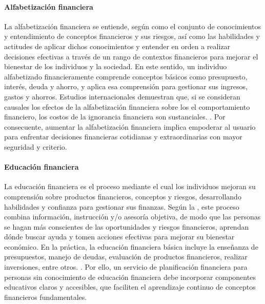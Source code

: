 \paragraph*{Alfabetización financiera}
La alfabetización financiera se entiende, según \textcite{OECD01} como el conjunto de conocimientos y entendimiento de conceptos financieros y sus riesgos, así como las habilidades y actitudes de aplicar dichos conocimientos y entender en orden a realizar decisiones efectivas a través de un rango de contextos financieros para mejorar el bienestar de los individuos y la sociedad. En este sentido, un individuo alfabetizado financieramente comprende conceptos básicos como presupuesto, interés, deuda y ahorro, y aplica esa comprensión para gestionar sus ingresos, gastos y ahorros. Estudios internacionales demuestran que, si se consideran causales los efectos de la alfabetización financiera sobre los el comportamiento financiero, los costos de la ignorancia financiera son sustanciales. \parencite[p.~17]{PMC01}. Por consecuente, aumentar la alfabetización financiera implica empoderar al usuario para enfrentar decisiones financieras cotidianas y extraordinarias con mayor seguridad y criterio.

\paragraph*{Educación financiera}
La educación financiera es el proceso mediante el cual los individuos mejoran su comprensión sobre productos financieros, conceptos y riesgos, desarrollando habilidades y confianza para gestionar sus finanzas. Según la \textcite{OECD02}, este proceso combina información, instrucción y/o asesoría objetiva, de modo que las personas se hagan más conscientes de las oportunidades y riesgos financieros, aprendan dónde buscar ayuda y tomen acciones efectivas para mejorar su bienestar económico. En la práctica, la educación financiera básica incluye la enseñanza de presupuestos, manejo de deudas, evaluación de productos financieros, realizar inversiones, entre otros. \parencite{Investopedia01}. Por ello, un servicio de planificación financiera para personas sin conocimiento de educación financiera debe incorporar componentes educativos claros y accesibles, que faciliten el aprendizaje continuo de conceptos financieros fundamentales.

